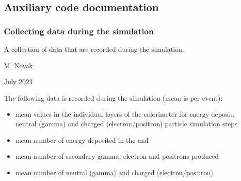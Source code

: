 \documentclass[letterpaper,10pt,english]{sphinxmanual}
\begin{document}
\subsection{Auxiliary code documentation}
\label{\detokenize{Simulation/SimulationCodeDoc:auxiliary-code-documentation}}

\subsubsection{Collecting data during the simulation}
\label{\detokenize{Simulation/SimulationCodeDoc:collecting-data-during-the-simulation}}
\sphinxAtStartPar
A collection of data that are recorded during the simulation. 

\sphinxAtStartPar
\begin{description}
\sphinxAtStartPar
M. Novak 

\sphinxAtStartPar
July 2023

\end{description}


\sphinxAtStartPar
The following data is recorded during the simulation (mean is per event):\begin{itemize}
\item {} 
\sphinxAtStartPar
mean values in the individual layers of the calorimeter for energy deposit, neutral (gamma) and charged (electron/positron) particle simulation steps

\item {} 
\sphinxAtStartPar
mean number of energy deposited in the  and 

\item {} 
\sphinxAtStartPar
mean number of secondary gamma, electron and positrons produced

\item {} 
\sphinxAtStartPar
mean number of neutral (gamma) and charged (electron/positron)

\end{itemize}
\end{document}
